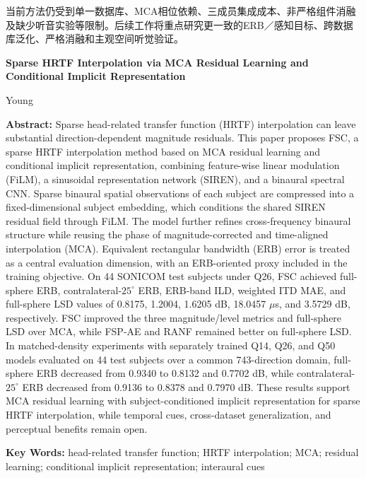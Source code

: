 \documentclass[UTF8,a4paper]{article}
\newenvironment{eAbstract}{\par\noindent\sffamily\small{\bfseries Abstract: }}{\par}
\newenvironment{eKeywords}{\par\smallskip\noindent\sffamily\small{\bfseries Key Words: }}{\par}
\begin{document}
当前方法仍受到单一数据库、MCA相位依赖、三成员集成成本、非严格组件消融及缺少听音实验等限制。后续工作将重点研究更一致的ERB／感知目标、跨数据库泛化、严格消融和主观空间听觉验证。



\clearpage
\begin{center}
{\normalsize\bfseries Sparse HRTF Interpolation via MCA Residual Learning and Conditional Implicit Representation\par}
\smallskip
{\small Young\par}
\end{center}

\begin{eAbstract}
Sparse head-related transfer function (HRTF) interpolation can leave substantial direction-dependent magnitude residuals. This paper proposes FSC, a sparse HRTF interpolation method based on MCA residual learning and conditional implicit representation, combining feature-wise linear modulation (FiLM), a sinusoidal representation network (SIREN), and a binaural spectral CNN. Sparse binaural spatial observations of each subject are compressed into a fixed-dimensional subject embedding, which conditions the shared SIREN residual field through FiLM. The model further refines cross-frequency binaural structure while reusing the phase of magnitude-corrected and time-aligned interpolation (MCA). Equivalent rectangular bandwidth (ERB) error is treated as a central evaluation dimension, with an ERB-oriented proxy included in the training objective. On 44 SONICOM test subjects under Q26, FSC achieved full-sphere ERB, contralateral-$25^\circ$ ERB, ERB-band ILD, weighted ITD MAE, and full-sphere LSD values of 0.8175, 1.2004, 1.6205 dB, 18.0457 $\mu$s, and 3.5729 dB, respectively. FSC improved the three magnitude/level metrics and full-sphere LSD over MCA, while FSP-AE and RANF remained better on full-sphere LSD. In matched-density experiments with separately trained Q14, Q26, and Q50 models evaluated on 44 test subjects over a common 743-direction domain, full-sphere ERB decreased from 0.9340 to 0.8132 and 0.7702 dB, while contralateral-$25^\circ$ ERB decreased from 0.9136 to 0.8378 and 0.7970 dB. These results support MCA residual learning with subject-conditioned implicit representation for sparse HRTF interpolation, while temporal cues, cross-dataset generalization, and perceptual benefits remain open.
\end{eAbstract}

\begin{eKeywords}
head-related transfer function; HRTF interpolation; MCA; residual learning; conditional implicit representation; interaural cues
\end{eKeywords}
\end{document}
